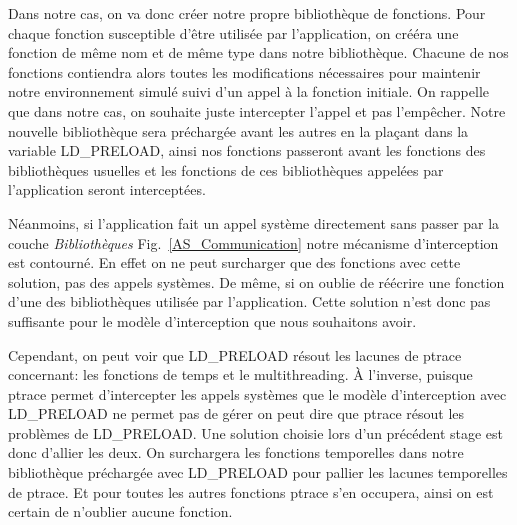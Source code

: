 Dans notre cas, on va donc créer notre propre bibliothèque de fonctions. Pour
chaque fonction susceptible d'être utilisée par l'application, on crééra une
fonction de même nom et de même type dans notre bibliothèque. Chacune de nos
fonctions contiendra alors toutes les modifications nécessaires pour maintenir
notre environnement simulé suivi d'un appel à la fonction initiale. On rappelle que  dans
notre cas, on souhaite juste intercepter l'appel et pas l'empêcher. %
Notre nouvelle bibliothèque sera préchargée
avant les autres en la plaçant dans la variable LD\_PRELOAD, ainsi nos fonctions
passeront avant les fonctions des bibliothèques usuelles et les fonctions de ces
bibliothèques appelées par l'application seront interceptées.

Néanmoins, si l'application fait un appel système directement sans passer par la
couche \textit{Bibliothèques} Fig.~\ref{AS_Communication} notre mécanisme
d'interception est contourné. En effet on ne peut surcharger que des fonctions
avec cette solution, pas des appels systèmes. De même, si on oublie de réécrire
une fonction d'une des bibliothèques utilisée par l'application. Cette solution
n'est donc pas suffisante pour le modèle d'interception que nous souhaitons
avoir.

Cependant, on peut voir que LD\_PRELOAD résout les lacunes de ptrace concernant:
les fonctions de temps et le multithreading. À l'inverse, puisque ptrace permet
d'intercepter les appels systèmes que le modèle d'interception avec LD\_PRELOAD
ne permet pas de gérer on peut dire que ptrace résout les problèmes de
LD\_PRELOAD. Une solution choisie lors d'un précédent stage est donc d'allier
les deux. On surchargera les fonctions temporelles dans notre bibliothèque
préchargée avec LD\_PRELOAD pour pallier les lacunes temporelles de ptrace. Et
pour toutes les autres fonctions ptrace s'en occupera, ainsi on est certain de
n'oublier aucune fonction.

